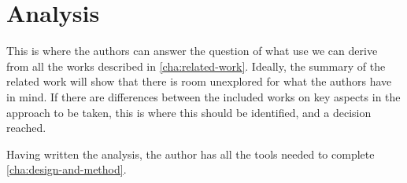 \chapter{Analysis}
\label{cha:analysis}

This is where the authors can answer the question of what use we can
derive from all the works described in
\autoref{cha:related-work}. Ideally, the summary of the related work
will show that there is room unexplored for what the authors have in
mind. If there are differences between the included works on key
aspects in the approach to be taken, this is where this should be
identified, and a decision reached.

Having written the analysis, the author has all the tools needed to
complete \autoref{cha:design-and-method}.



